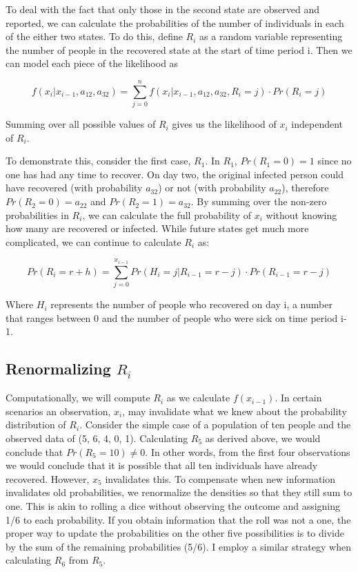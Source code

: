 \documentclass{svproc}
\begin{document}
To deal with the fact that only those in the second state are observed and reported, we can calculate the probabilities of the number of individuals in each of the either two states. To do this, define $R_i$ as a random variable representing the number of people in the recovered state at the start of time period i. Then we can model each piece of the likelihood as

\begin{equation}
f(x_i | x_{i-1}, a_{12}, a_{32}) =\sum_{j=0}^n f(x_i | x_{i-1}, a_{12}, a_{32}, R_i=j)\cdot Pr(R_i=j) 
\label{sum}
\end{equation}

Summing over all possible values of $R_i$ gives us the likelihood of $x_i$ independent of $R_i$.

To demonstrate this, consider the first case, $R_1$. In $R_1$, $Pr(R_1=0)=1$ since no one has had any time to recover. On day two, the original infected person could have recovered (with probability $a_{32}$) or not (with probability $a_{22}$), therefore $Pr(R_2=0) = a_{22}$ and $Pr(R_2=1)=a_{32}$. By summing over the non-zero probabilities in $R_i$, we can calculate the full probability of $x_i$ without knowing how many are recovered or infected. While future states get much more complicated, we can continue to calculate $R_i$ as:

\begin{equation}
Pr(R_i = r + h) = \sum_{j=0}^{x_{i-1}} Pr(H_i=j|R_{i-1}=r-j)\cdot Pr(R_{i-1}=r-j)
\end{equation}

Where $H_i$ represents the number of people who recovered on day i, a number that ranges between 0 and the number of people who were sick on time period i-1.

\subsection*{Renormalizing $R_i$}
Computationally, we will compute 
$R_i$ as we calculate $f(x_{i-1})$. In certain scenarios an observation, $x_i$, may invalidate what we knew about the probability distribution of $R_i$. Consider the simple case of a population of ten people and the observed data of (5, 6, 4, 0, 1). Calculating $R_5$ as derived above, we would conclude that $Pr(R_5 =10)\neq 0$. In other words, from the first four observations we would conclude that it is possible that all ten individuals have already recovered. However, $x_5$ invalidates this. To compensate when new information invalidates old  probabilities, we renormalize the densities so that they still sum to one. This is akin to rolling a dice without observing the outcome and assigning 1/6 to each probability. If you obtain information that the roll was not a one, the proper way to update the probabilities on the other five possibilities is to divide by the sum of the remaining probabilities (5/6). I employ a similar strategy when calculating $R_6$ from $R_5$.
\end{document}
